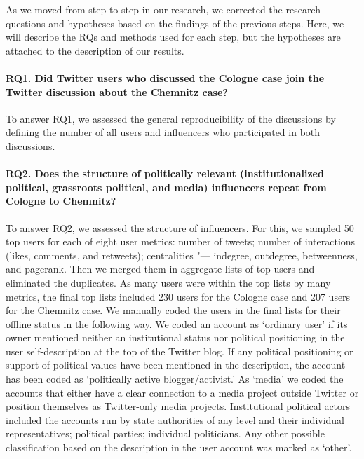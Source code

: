 As we moved from step to step in our research, we corrected the research questions and hypotheses based on the findings of the previous steps. Here, we will describe the RQs and methods used for each step, but the hypotheses are attached to the description of our results.

\paragraph{RQ1. Did Twitter users who discussed the Cologne case join the Twitter discussion about the Chemnitz case?}

To answer RQ1, we assessed the general reproducibility of the discussions by defining the number of all users and influencers who participated in both discussions.

\paragraph{RQ2. Does the structure of politically relevant (institutionalized political, grassroots political, and media) influencers repeat from Cologne to Chemnitz?}

To answer RQ2, we assessed the structure of influencers. For this, we sampled 50 top users for each of eight user metrics: number of tweets; number of interactions (likes, comments, and retweets); centralities "--- indegree, outdegree, betweenness, and pagerank. Then we merged them in aggregate lists of top users and eliminated the duplicates. As many users were within the top lists by many metrics, the final top lists included 230 users for the Cologne case and 207 users for the Chemnitz case. We manually coded the users in the final lists for their offline status in the following way. We coded an account as ‘ordinary user’ if its owner mentioned neither an institutional status nor political positioning in the user self-description at the top of the Twitter blog. If any political positioning or support of political values have been mentioned in the description, the account has been coded as ‘politically active blogger/activist.’ As ‘media’ we coded the accounts that either have a clear connection to a media project outside Twitter or position themselves as Twitter-only media projects. Institutional political actors included the accounts run by state authorities of any level and their individual representatives; political parties; individual politicians. Any other possible classification based on the description in the user account was marked as ‘other’.

